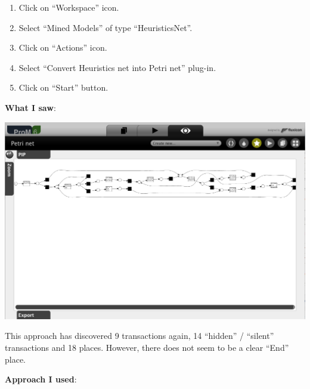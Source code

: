 \documentclass[]{article}
\begin{document}
\begin{enumerate}
\def\labelenumi{\arabic{enumi}.}
\setcounter{enumi}{29}
\itemsep1pt\parskip0pt
\item
  Click on ``Workspace'' icon.\\
\item
  Select ``Mined Models'' of type ``HeuristicsNet''.\\
\item
  Click on ``Actions'' icon.\\
\item
  Select ``Convert Heuristics net into Petri net'' plug-in.\\
\item
  Click on ``Start'' button.
\end{enumerate}

\textbf{What I saw}:

\includegraphics{CoSeLoG_Step_05_Filter96_PetriNet_Heuristics.png}

This approach has discovered 9 transactions again, 14 ``hidden'' /
``silent'' transactions and 18 places. However, there does not seem to
be a clear ``End'' place.

\textbf{Approach I used}:
\end{document}
